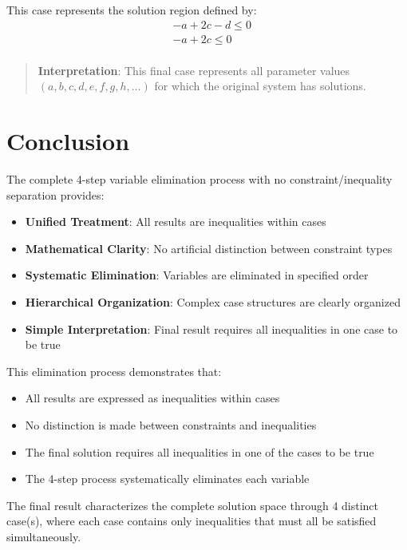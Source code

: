 \documentclass{article}
\newenvironment{stepdetail}
  {\begin{quote}\small\color{blue}}
  {\end{quote}}
\begin{document}
This case represents the solution region defined by:
\begin{align}
& - a + 2 c - d \leq 0 \\
& - a + 2 c \leq 0 \\
\end{align}

\begin{stepdetail}
\textbf{Interpretation}: This final case represents all parameter values
$(a, b, c, d, e, f, g, h, \ldots)$ for which the original system has solutions.
\end{stepdetail}

\section{Conclusion}

The complete 4-step variable elimination process with no constraint/inequality separation provides:
\begin{itemize}
\item \textbf{Unified Treatment}: All results are inequalities within cases
\item \textbf{Mathematical Clarity}: No artificial distinction between constraint types
\item \textbf{Systematic Elimination}: Variables are eliminated in specified order
\item \textbf{Hierarchical Organization}: Complex case structures are clearly organized
\item \textbf{Simple Interpretation}: Final result requires all inequalities in one case to be true
\end{itemize}

This elimination process demonstrates that:
\begin{itemize}
\item All results are expressed as inequalities within cases
\item No distinction is made between constraints and inequalities
\item The final solution requires all inequalities in one of the cases to be true
\item The 4-step process systematically eliminates each variable
\end{itemize}

The final result characterizes the complete solution space through
4 distinct case(s), where each case contains only inequalities
that must all be satisfied simultaneously.
\end{document}
